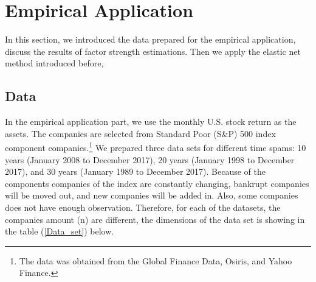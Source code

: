 




%
	\section{Empirical Application}

	In this section, we introduced the data prepared for the empirical application, discuss the results of factor strength estimations. Then we apply the elastic net method introduced before, 
	\subsection{Data}\label{data}
	
In the empirical application part, we use the monthly U.S. stock return as the assets.
The companies are selected from Standard Poor (S\&P) 500 index component companies.\footnote{The data was obtained from the Global Finance Data, Osiris, and Yahoo Finance.}
We prepared three data sets for different time spams: 10 years (January 2008 to December 2017), 20 years (January 1998 to December 2017), and 30 years (January 1989 to December 2017).
Because of the components companies of the index are constantly changing, bankrupt companies will be moved out, and new companies will be added in.
Also, some companies does not have enough observation.
Therefore, for each of the datasets, the companies amount (n) are different, the dimensions of the data set is showing in the table (\ref{Data_set}) below.

